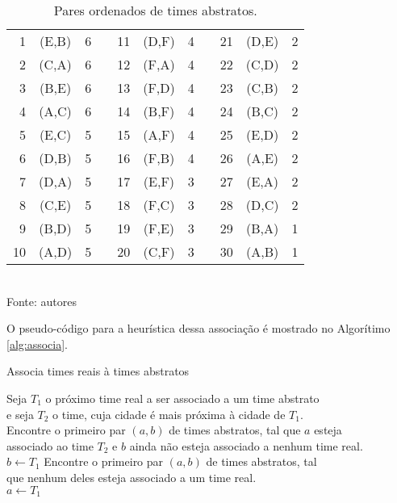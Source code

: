 \documentclass[12pt,a4paper]{article}
\makeatletter
\newcommand{\algorithmfootnote}[2][\footnotesize]{%
	\let\old@algocf@finish\@algocf@finish%
	\def\@algocf@finish{\old@algocf@finish%
		\leavevmode\rlap{\begin{minipage}{\linewidth}
				#1#2
		\end{minipage}}%
	}%
}
\makeatother
\begin{document}
\begin{table}[H]
	\centering
	\caption{Pares ordenados de times abstratos.}
	\label{tab:abstratos}
	\vspace{0.2cm}
	\begin{tabular}{rcc c rcc c rcc}
		\toprule
		 1 & (E,B) & 6 && 11 & (D,F) & 4 && 21 & (D,E) & 2 \\
		 2 & (C,A) & 6 && 12 & (F,A) & 4 && 22 & (C,D) & 2 \\
		 3 & (B,E) & 6 && 13 & (F,D) & 4 && 23 & (C,B) & 2 \\
		 4 & (A,C) & 6 && 14 & (B,F) & 4 && 24 & (B,C) & 2 \\
		 5 & (E,C) & 5 && 15 & (A,F) & 4 && 25 & (E,D) & 2 \\
		 6 & (D,B) & 5 && 16 & (F,B) & 4 && 26 & (A,E) & 2 \\
		 7 & (D,A) & 5 && 17 & (E,F) & 3 && 27 & (E,A) & 2 \\
		 8 & (C,E) & 5 && 18 & (F,C) & 3 && 28 & (D,C) & 2 \\
		 9 & (B,D) & 5 && 19 & (F,E) & 3 && 29 & (B,A) & 1 \\
		10 & (A,D) & 5 && 20 & (C,F) & 3 && 30 & (A,B) & 1 \\
		\bottomrule
	\end{tabular}
	\vspace{0.2cm}\\
	\footnotesize Fonte: autores
\end{table}

O pseudo-código para a heurística dessa associação é mostrado no Algorítimo \ref{alg:associa}.

\vspace{0.5cm}
\begin{algorithm}[H]
	\caption{Associa times reais à times abstratos}
	\algorithmfootnote{Fonte: \Citeauthor{marcio:jogos} \Citep{marcio:jogos}}
	\label{alg:associa}
	 {
		Seja $T_{1}$ o próximo time real a ser associado a um time abstrato\\
		e seja $T_{2}$ o time, cuja cidade é mais próxima à cidade de $T_{1}$.\\
		 {
			Encontre o primeiro par $(a,b)$ de times abstratos, tal que $a$ esteja\\
			associado ao time $T_{2}$ e $b$ ainda não esteja associado a nenhum time real.\\
			$b \leftarrow T_{1}$ }
		{ Encontre o primeiro par $(a,b)$ de times abstratos, tal\\
			que nenhum deles esteja associado a um time real.\\
			$a \leftarrow T_{1}$ } }
\end{algorithm}
\vspace{0.5cm}
\end{document}
